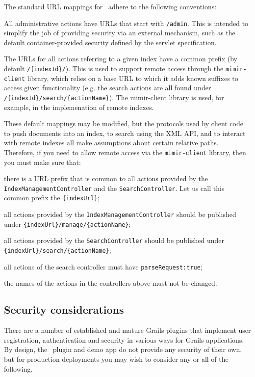 The standard URL mappings for \Mimir\ adhere to the following conventions:
\bit
  \item All administrative actions have URLs that start with {\tt /admin}. This
  is intended to simplify the job of providing security via an external
  mechanism, such as the default container-provided security defined by the
  servlet specification.
  \item The URLs for all actions referring to a given index have a common prefix
  (by default {\tt /\{indexId\}/}). This is used to support remote access
  through the {\tt mimir-client} library, which relies on a base URL to which it
  adds known suffixes to access given functionality (e.g. the search actions
  are all found under {\tt /\{indexId\}/search/\{actionName\}}). The
  mimir-client library is used, for example, in the implemenation of remote
  indexes.
\eit

These default mappings may be modified, but the protocols used by client
code to push documents into an index, to search using the XML API, and to
interact with remote indexes all make assumptions about certain relative paths.
Therefore, if you need to allow remote access via the {\tt mimir-client}
library, then you must make sure that:

\bit
\item there is a URL prefix that is common to all actions provided by the
  {\tt IndexManagementController} and the {\tt SearchController}. Let us call
  this common prefix the {\tt \{indexUrl\}};
\item all actions provided by the {\tt IndexManagementController} should be
  published under {\tt \{indexUrl\}/manage/\{actionName\}};
\item all actions provided by the {\tt SearchController} should be
  published under {\tt \{indexUrl\}/search/\{actionName\}};
\item all actions of the search controller must have {\tt parseRequest:true}; 
\item the names of the actions in the controllers above must not be changed.
\eit 

\subsection{Security considerations}

There are a number of established and mature Grails plugins that implement user
registration, authentication and security in various ways for Grails
applications.  By design, the \Mimir\ plugin and demo app do not provide any
security of their own, but for production deployments you may wish to consider
any or all of the following.

